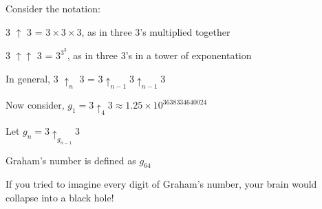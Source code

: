 \documentclass[12pt]{article}
\begin{document}
\setlength{\parindent}{0pt}

Consider the notation:

3 $\uparrow$ 3 = $3 \times 3 \times 3$, as in three 3's multiplied together

3 $\uparrow\uparrow$ 3 = $3^{3^{3}}$, as in three 3's in a tower of exponentation

In general, 3 $\uparrow_{n}$ 3 = $3 \uparrow_{n-1} 3 \uparrow_{n-1} 3$

Now consider, $g_{1} = 3 \uparrow_{4} 3 \approx 1.25 \times 10^{3638334640024}$

Let $g_{n} = 3 \uparrow_{g_{n-1}} 3$

Graham's number is defined as $g_{64}$

If you tried to imagine every digit of Graham's number, your brain would collapse into a black hole!
\end{document}
